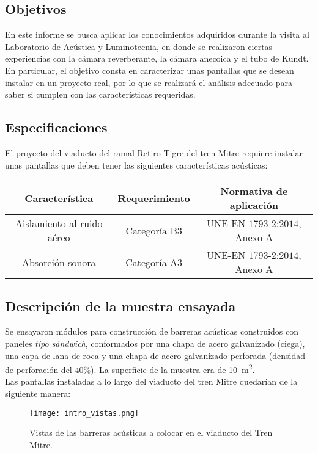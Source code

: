 	\subsection{Objetivos}

		En este informe se busca aplicar los conocimientos adquiridos durante la visita al Laboratorio de Acústica y Luminotecnia, en donde se realizaron ciertas experiencias con la cámara reverberante, la cámara anecoica y el tubo de Kundt. En particular, el objetivo consta en caracterizar unas pantallas que se desean instalar en un proyecto real, por lo que se realizará el análisis adecuado para saber si cumplen con las características requeridas.
		
	\subsection{Especificaciones}
	
	El proyecto del viaducto del ramal Retiro-Tigre del tren Mitre requiere instalar unas pantallas que deben tener las siguientes características acústicas:
		
		\begin{table}[h!]
			\centering
			\begin{tabular}{ccc}
			\toprule
			\textbf{Característica} & \textbf{Requerimiento} & \textbf{Normativa de aplicación}\\
			\midrule
			Aislamiento al ruido aéreo & Categoría B3 & UNE-EN $1793$-$2$:$2014$, Anexo A\\
			Absorción sonora & Categoría A3 & UNE-EN $1793$-$2$:$2014$, Anexo A\\
			\bottomrule
			\end{tabular}
		\end{table}
		
	\subsection{Descripción de la muestra ensayada}
		
		Se ensayaron módulos para construcción de barreras acústicas construidos con paneles \textit{tipo sándwich}, conformados por una chapa de acero galvanizado (ciega), una capa de lana de roca y una chapa de acero galvanizado perforada (densidad de perforación del $40\%$). La superficie de la muestra era de \SI{10}{\square\meter}.\\
		
		Las pantallas instaladas a lo largo del viaducto del tren Mitre quedarían de la siguiente manera:

		\begin{figure}[H]
			\centering
		\texttt{[image: intro\_vistas.png]}\\
			\caption{Vistas de las barreras acústicas a colocar en el viaducto del Tren Mitre.}
			\label{intro_vistas}
		\end{figure}
